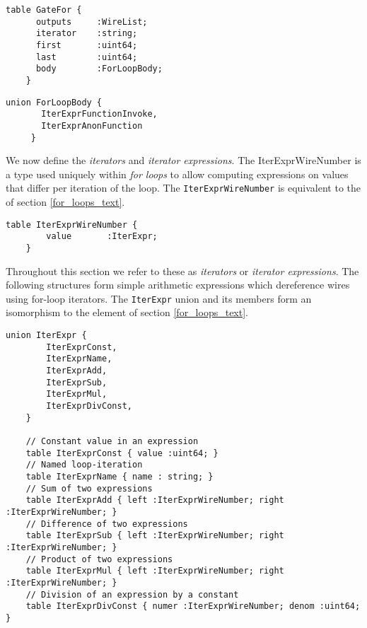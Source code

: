 \begin{lstlisting}[style=fbslisting]
    table GateFor {
      outputs     :WireList;
      iterator    :string;
      first       :uint64;
      last        :uint64;
      body        :ForLoopBody;
    }
\end{lstlisting}

\begin{lstlisting}[style=fbslisting]
     union ForLoopBody {
       IterExprFunctionInvoke,
       IterExprAnonFunction
     }       
\end{lstlisting}

We now define the \emph{iterators} and \emph{iterator expressions}. The \textsf{IterExprWireNumber} is a type used uniquely within \emph{for loops} to allow computing expressions on values that differ per iteration of the loop. The \texttt{IterExprWireNumber} is equivalent to the  of section \ref{for_loops_text}.

\begin{lstlisting}[style=fbslisting]
    table IterExprWireNumber {
        value       :IterExpr;
    }
\end{lstlisting}

Throughout this section we refer to these as \emph{iterators} or \emph{iterator expressions}. The following structures form simple arithmetic expressions which dereference wires using for-loop iterators. The \texttt{IterExpr} union and its members form an isomorphism to the  element of section \ref{for_loops_text}.

\begin{lstlisting}[style=fbslisting]
    union IterExpr {
        IterExprConst,
        IterExprName,
        IterExprAdd,
        IterExprSub,
        IterExprMul,
        IterExprDivConst,
    }

    // Constant value in an expression
    table IterExprConst { value :uint64; }
    // Named loop-iteration
    table IterExprName { name : string; }
    // Sum of two expressions
    table IterExprAdd { left :IterExprWireNumber; right :IterExprWireNumber; }
    // Difference of two expressions
    table IterExprSub { left :IterExprWireNumber; right :IterExprWireNumber; }
    // Product of two expressions
    table IterExprMul { left :IterExprWireNumber; right :IterExprWireNumber; }
    // Division of an expression by a constant
    table IterExprDivConst { numer :IterExprWireNumber; denom :uint64; }
\end{lstlisting}

